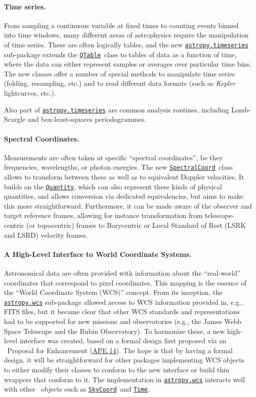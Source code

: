 \documentclass[modern]{aastex631}
\newcommand{\astropysubpkg}[1]{\href{http://docs.astropy.org/en/stable/#1/index.html}{\texttt{astropy.#1}}\xspace}
\newcommand{\astropyapi}[2]{\href{https://docs.astropy.org/en/stable/api/astropy.#1.html}{#2}}
\newcommand{\astropyapidoc}[2]{\astropyapi{#1}{\texttt{#2}\xspace}}
\newcommand{\astropySpectralCoord}{\astropyapidoc{coordinates.SpectralCoord}{SpectralCoord}}
\newcommand{\astropySkyCoord}{\astropyapidoc{coordinates.SkyCoord}{SkyCoord}}
\newcommand{\astropyQTable}{\astropyapidoc{table.QTable}{QTable}}
\newcommand{\astropyTime}{\astropyapidoc{time.Time}{Time}}
\newcommand{\astropyQuantity}{\astropyapidoc{units.Quantity}{Quantity}}
\newcommand{\astropyAPE}[1]{\href{https://github.com/astropy/astropy-APEs/blob/main/APE#1.rst}{APE #1}\xspace}
\begin{document}
\paragraph{Time series.}  From sampling a continuous variable at fixed
times to counting events binned into time windows, many different
areas of astrophysics require the manipulation of time series.  These
are often logically tables, and the new \astropysubpkg{timeseries}
sub-package extends the \astropyQTable\ class to tables of data as a
function of time, where the data can either represent samples or
averages over particular time bins.  The new classes offer a number of
special methods to manipulate time series (folding, resampling, etc.)
and to read different data formats (such as {\em Kepler} lightcurves,
etc.).

Also part of \astropysubpkg{timeseries} are common analysis routines,
including Lomb-Scargle and box-least-squares periodogrammes.

\paragraph{Spectral Coordinates.} Measurements are often taken at
specific ``spectral coordinates'', be they frequencies, wavelengths,
or photon energies.  The new \astropySpectralCoord\ class allows to
transform between these as well as to equivalent Doppler velocities.
It builds on the \astropyQuantity, which can also represent these
kinds of physical quantities, and allows conversion via dedicated
equivalencies, but aims to make this more straightforward.
Furthermore, it can be made aware of the observer and target reference
frames, allowing for instance transformation from telescope-centric (or
topocentric) frames to Barycentric or Local Standard of Rest
(LSRK and LSRD) velocity frames.

\paragraph{A High-Level Interface to World Coordinate Systems.}
Astronomical data are often provided with information about the
``real-world'' coordinates that correspond to pixel coordinates. This
mapping is the essence of the ``World Coordinate System (WCS)''
concept.  From its inception, the \astropysubpkg{wcs} sub-package
allowed access to WCS information provided in, e.g., FITS files, but
it became clear that other WCS standards and representations had to be
supported for new missions and observatories (e.g., the James Webb
Space Telescope and the Rubin Observatory).  To harmonize these, a new
high-level interface was created, based on a formal design first
proposed via an \astropy\ Proposal for Enhancement (\astropyAPE{14}).
The hope is that by having a formal design, it will be straightforward
for other packages implementing WCS objects to either modify their
classes to conform to the new interface or build thin wrappers that
conform to it.  The implementation in \astropysubpkg{wcs} interacts
well with other \astropypkg\ objects such as \astropySkyCoord\ and
\astropyTime.
\end{document}
